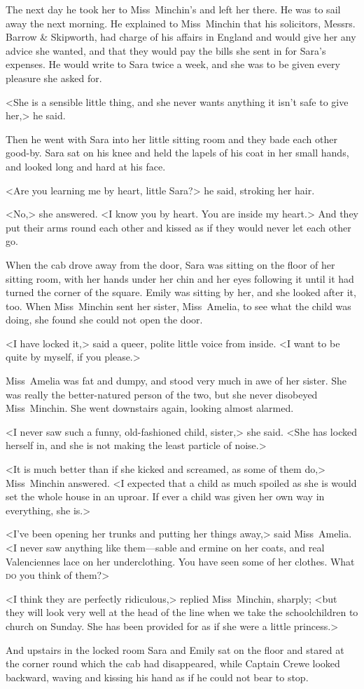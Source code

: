 The next day he took her to Miss~Minchin's and left her there. He was to sail away the next morning. He explained to Miss~Minchin that his solicitors, Messrs. Barrow \& Skipworth, had charge of his affairs in England and would give her any advice she wanted, and that they would pay the bills she sent in for Sara's expenses. He would write to Sara twice a week, and she was to be given every pleasure she asked for.

<She is a sensible little thing, and she never wants anything it isn't safe to give her,> he said.

Then he went with Sara into her little sitting room and they bade each other good-by. Sara sat on his knee and held the lapels of his coat in her small hands, and looked long and hard at his face.

<Are you learning me by heart, little Sara?> he said, stroking her hair.

<No,> she answered. <I know you by heart. You are inside my heart.> And they put their arms round each other and kissed as if they would never let each other go.

When the cab drove away from the door, Sara was sitting on the floor of her sitting room, with her hands under her chin and her eyes following it until it had turned the corner of the square. Emily was sitting by her, and she looked after it, too. When Miss~Minchin sent her sister, Miss~Amelia, to see what the child was doing, she found she could not open the door.

<I have locked it,> said a queer, polite little voice from inside. <I want to be quite by myself, if you please.>

Miss~Amelia was fat and dumpy, and stood very much in awe of her sister. She was really the better-natured person of the two, but she never disobeyed Miss~Minchin. She went downstairs again, looking almost alarmed.

<I never saw such a funny, old-fashioned child, sister,> she said. <She has locked herself in, and she is not making the least particle of noise.>

<It is much better than if she kicked and screamed, as some of them do,> Miss~Minchin answered. <I expected that a child as much spoiled as she is would set the whole house in an uproar. If ever a child was given her own way in everything, she is.>

<I've been opening her trunks and putting her things away,> said Miss~Amelia. <I never saw anything like them—sable and ermine on her coats, and real Valenciennes lace on her underclothing. You have seen some of her clothes. What \textsc{do} you think of them?>

<I think they are perfectly ridiculous,> replied Miss~Minchin, sharply; <but they will look very well at the head of the line when we take the schoolchildren to church on Sunday. She has been provided for as if she were a little princess.>

And upstairs in the locked room Sara and Emily sat on the floor and stared at the corner round which the cab had disappeared, while Captain Crewe looked backward, waving and kissing his hand as if he could not bear to stop.